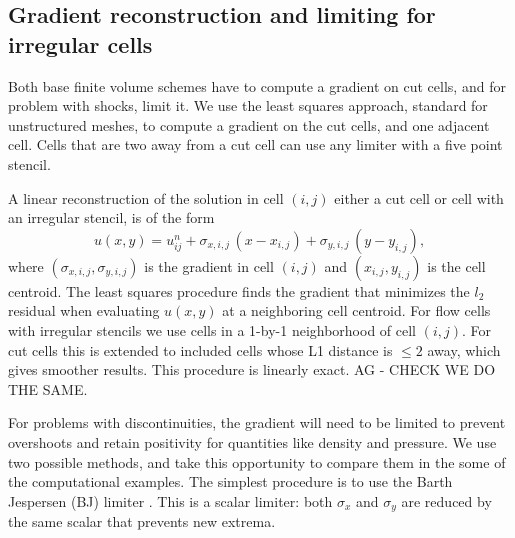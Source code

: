 \subsection{Gradient reconstruction and limiting for irregular
cells}\label{sec:limit}

Both base finite volume schemes have to compute a gradient on cut cells, and for
problem with shocks, limit it. 
We use the least squares approach, standard for unstructured meshes,
to compute a gradient on the cut cells, and one adjacent cell.
Cells that are two away from a cut cell
can use any limiter with a five point stencil. 

A linear reconstruction of the solution in cell $(i,j)$
either a cut cell or cell with an irregular stencil, is of the form
\begin{equation}
u(x,y) = u_{ij}^n + \sigma_{x,i,j} \,(x-x_{i,j}) +
                     \sigma_{y,i,j}\,(y-y_{i,j}),
\label{eqn:lls}
\end{equation}
where $(\sigma_{x,i,j},\sigma_{y,i,j})$ is the gradient in 
cell $(i,j)$ and $(x_{i,j},y_{i,j})$ is the cell centroid. The least squares procedure
finds the gradient that minimizes the $l_2$ residual when evaluating  $u(x,y)$
at a neighboring cell centroid. 
For flow cells with irregular stencils we use cells in a 1-by-1
neighborhood of cell $(i,j)$.
For cut cells this is extended to included cells whose L1 distance is $\le
2$ away, which gives smoother results.
This procedure is linearly exact. AG - CHECK WE DO THE SAME.  

For problems with discontinuities, the gradient will need to be limited
to prevent overshoots and retain positivity for quantities like density and
pressure.
We use two possible methods, and take this opportunity to
compare them in the some of the 
computational examples.
The simplest procedure  is to use the Barth Jespersen (BJ) limiter
\cite{barth-jespersen}. 
This is a scalar limiter: both $\sigma_x$ and $\sigma_y$ are reduced by
the same scalar that prevents new extrema.  


